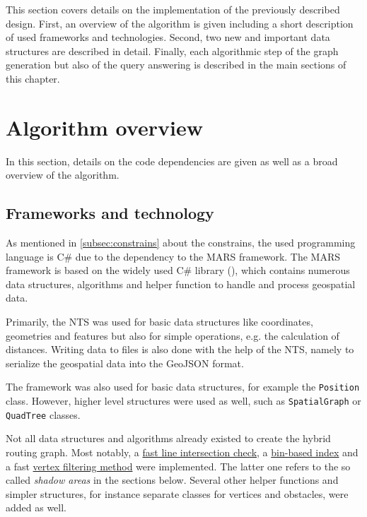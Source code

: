 
This section covers details on the implementation of the previously described design.
First, an overview of the algorithm is given including a short description of used frameworks and technologies.
Second, two new and important data structures are described in detail.
Finally, each algorithmic step of the graph generation but also of the query answering is described in the main sections of this chapter.

\section{Algorithm overview}

	In this section, details on the code dependencies are given as well as a broad overview of the algorithm.

	\subsection{Frameworks and technology}
	\label{subsec:frameworks-technology}
	
		As mentioned in \cref{subsec:constrains} about the constrains, the used programming language is C\# due to the dependency to the MARS framework.
		The MARS framework is based on the widely used C\# library  (), which contains numerous data structures, algorithms and helper function to handle and process geospatial data.
		
		Primarily, the NTS was used for basic data structures like coordinates, geometries and features but also for simple operations, e.g. the calculation of distances.
		Writing data to files is also done with the help of the NTS, namely to serialize the geospatial data into the GeoJSON format.
		
		The  framework was also used for basic data structures, for example the \texttt{Position} class.
		However, higher level structures were used as well, such as \texttt{SpatialGraph} or \texttt{QuadTree} classes.
		
		Not all data structures and algorithms already existed to create the hybrid routing graph.
		Most notably, a \hyperref[subsubsec:intersection-checks]{fast line intersection check}, a \hyperref[subsec:binindex]{bin-based index} and a fast \hyperref[subsec:shadow-areas]{vertex filtering method} were implemented.
		The latter one refers to the so called \emph{shadow areas} in the sections below.
		Several other helper functions and simpler structures, for instance separate classes for vertices and obstacles, were added as well.
	
